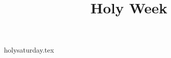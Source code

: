 \documentclass[letterpaper]{report}
\title{Holy Week}
\begin{document}
\maketitle

{holysaturday.tex}

\printbibliography
\end{document}
